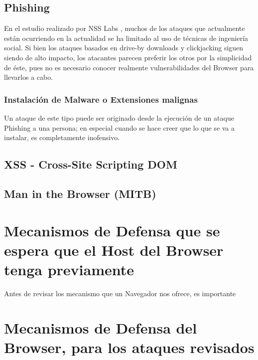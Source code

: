 \subsection{Phishing}
En el estudio realizado por NSS Labs \cite{browSecPhish}, muchos de los ataques que actualmente están ocurriendo en la actualidad se ha limitado al uso de técnicas de ingeniería social. Si bien los ataques basados en drive-by downloads y clickjacking siguen siendo de alto impacto, los atacantes parecen preferir los otros por la simplicidad de éste, pues no es necesario conocer realmente vulnerabilidades del Browser para llevarlos a cabo. 
	\subsubsection{Instalación de Malware o Extensiones malignas}
	Un ataque de este tipo puede ser originado desde la ejecución de un ataque Phishing a una persona; en especial cuando se hace creer que lo que se va a instalar, es completamente inofensivo.

\subsection{XSS - Cross-Site Scripting DOM}


\subsection{Man in the Browser (MITB)}



\section{Mecanismos de Defensa que se espera que el Host del Browser tenga previamente}
	Antes de revisar los mecanismo que un Navegador nos ofrece, es importante 


\section{Mecanismos de Defensa del Browser, para los ataques revisados}

